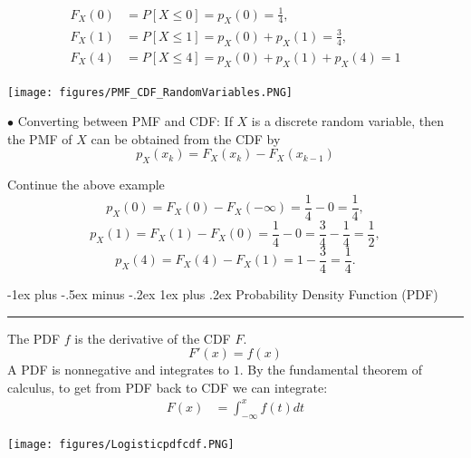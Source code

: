 \documentclass[letterpaper, 10.5pt,landscape]{article}
\makeatletter
\renewcommand{\subsubsection}{\@startsection{subsubsection}{3}{0mm}%
                                {-1ex plus -.5ex minus -.2ex}%
                                {1ex plus .2ex}%
                                {\normalfont\small\bfseries}}
\makeatother
\begin{document}
\begin{multicols*}{3}
\begin{align*}
    F_{X}(0) & = P[X \leq 0] = p_{X}(0) = \frac{1}{4}, \\
     F_{X}(1) &  = P[X \leq 1] = p_{X}(0) + p_{X}(1)  = \frac{3}{4}, \\
      F_{X}(4) &  = P[X \leq 4] = p_{X}(0) + p_{X}(1) + p_{X}(4)  = 1
\end{align*}

\vspace{-5pt}

\begin{center}
    \begin{minipage}{\linewidth}
    \texttt{[image: figures/PMF\_CDF\_RandomVariables.PNG]}
    \end{minipage}
\end{center}

$\bullet$ Converting between PMF and CDF: If $X$ is a discrete random variable, then the PMF of $X$ can be obtained from the CDF by \[\boxed{p_{X}(x_{k}) = F_{X}(x_{k}) - F_{X}(x_{k-1})}\]
\vspace{-5pt}

Continue the above example 
\vspace{-5pt}
    \[p_{X}(0) = F_{X}(0) - F_{X}(-\infty) = \frac{1}{4} - 0 = \frac{1}{4}, \]
    \[p_{X}(1) = F_{X}(1) - F_{X}(0) = \frac{1}{4} - 0 = \frac{3}{4} - \frac{1}{4} = \frac{1}{2}, \]
    \[p_{X}(4) = F_{X}(4) - F_{X}(1) = 1-\frac{3}{4} = \frac{1}{4}.\]



\subsubsection{Probability Density Function (PDF)}{\color{teal}\hrule height 0.5pt} \smallskip

The PDF $f$ is the derivative of the CDF $F$.
\[ F'(x) = f(x) \]
A PDF is nonnegative and integrates to $1$. By the fundamental theorem of calculus, to get from PDF back to CDF we can integrate:
\begin{align*} 
    F(x) &=  \int_{-\infty}^x f(t)dt  
   \end{align*}
   
   
\begin{center}
    \begin{minipage}{\linewidth}
    \texttt{[image: figures/Logisticpdfcdf.PNG]}
    \end{minipage}
\end{center}   



\end{multicols*}
\end{document}
